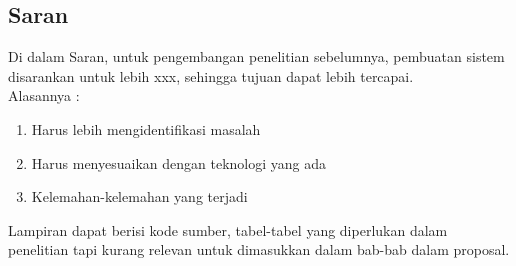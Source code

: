 \documentclass{thesis}
\begin{document}
\subsection{Saran}

Di dalam Saran, untuk pengembangan penelitian sebelumnya, pembuatan sistem disarankan untuk lebih xxx, sehingga tujuan dapat lebih tercapai.\\
Alasannya :
\begin{enumerate}
    \item Harus lebih mengidentifikasi masalah
    \item Harus menyesuaikan dengan teknologi yang ada
    \item Kelemahan-kelemahan yang terjadi 
\end{enumerate}

\daftarpustaka


Lampiran dapat berisi kode sumber, tabel-tabel yang diperlukan dalam penelitian tapi kurang relevan untuk dimasukkan dalam bab-bab dalam proposal. 
\end{document}
